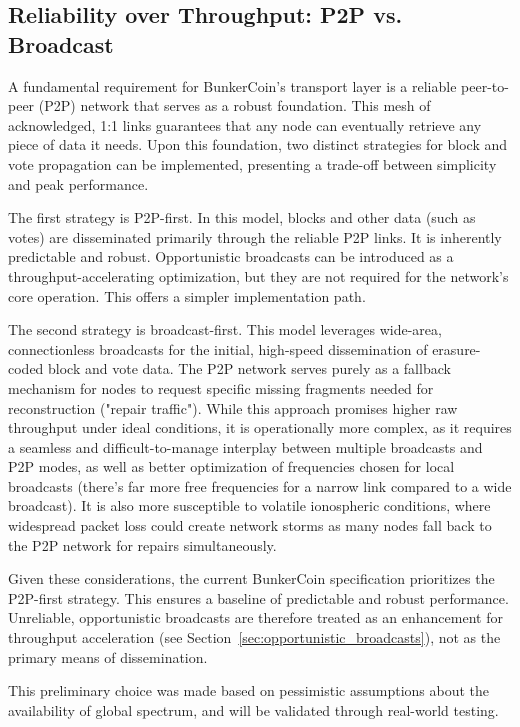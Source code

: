 \documentclass{article}
\begin{document}
\subsection{Reliability over Throughput: P2P vs. Broadcast}

A fundamental requirement for BunkerCoin's transport layer is a reliable peer-to-peer (P2P) network that serves as a robust foundation. This mesh of acknowledged, 1:1 links guarantees that any node can eventually retrieve any piece of data it needs. Upon this foundation, two distinct strategies for block and vote propagation can be implemented, presenting a trade-off between simplicity and peak performance.

The first strategy is P2P-first. In this model, blocks and other data (such as votes) are disseminated primarily through the reliable P2P links. It is inherently predictable and robust. Opportunistic broadcasts can be introduced as a throughput-accelerating optimization, but they are not required for the network's core operation. This offers a simpler implementation path.

The second strategy is broadcast-first. This model leverages wide-area, connectionless broadcasts for the initial, high-speed dissemination of erasure-coded block and vote data. The P2P network serves purely as a fallback mechanism for nodes to request specific missing fragments needed for reconstruction ("repair traffic"). While this approach promises higher raw throughput under ideal conditions, it is operationally more complex, as it requires a seamless and difficult-to-manage interplay between multiple broadcasts and P2P modes, as well as better optimization of frequencies chosen for local broadcasts (there's far more free frequencies for a narrow link compared to a wide broadcast). It is also more susceptible to volatile ionospheric conditions, where widespread packet loss could create network storms as many nodes fall back to the P2P network for repairs simultaneously.

Given these considerations, the current BunkerCoin specification prioritizes the P2P-first strategy. This ensures a baseline of predictable and robust performance. Unreliable, opportunistic broadcasts are therefore treated as an enhancement for throughput acceleration (see Section~\ref{sec:opportunistic_broadcasts}), not as the primary means of dissemination.

This preliminary choice was made based on pessimistic assumptions about the availability of global spectrum, and will be validated through real-world testing.
\end{document}
